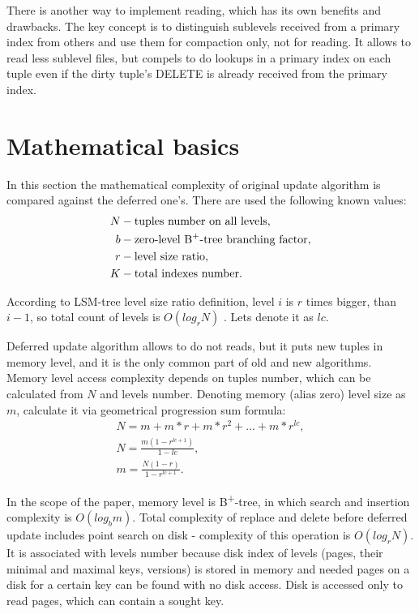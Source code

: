 \documentclass{vldb}
\begin{document}
There is another way to implement reading, which has its own benefits and
drawbacks. The key concept is to distinguish sublevels received from a primary
index from others and use them for compaction only, not for reading. It allows
to read less sublevel files, but compels to do lookups in a primary index on
each tuple even if the dirty tuple's DELETE is already received from the primary
index.

\section{Mathematical basics}

In this section the mathematical complexity of original update algorithm is
compared against the deferred one's. There are used the following known values:
\begin{align*}
N &- \text{tuples number on all levels}, \\
b &- \text{zero-level B\textsuperscript{+}-tree branching factor}, \\
r &- \text{level size ratio}, \\
K &- \text{total indexes number}.
\end{align*}

According to LSM-tree level size ratio definition, level $i$ is $r$ times
bigger, than $i - 1$, so total count of levels is $O(log_rN)$
\cite{kai:slimdb}. Lets denote it as $lc$.

Deferred update algorithm allows to do not reads, but it puts new tuples in
memory level, and it is the only common part of old and new algorithms. Memory
level access complexity depends on tuples number, which can be calculated from
$N$ and levels number. Denoting memory (alias zero) level size as $m$, calculate
it via geometrical progression sum formula:
\begin{gather*}
N = m + m*r + m*r^2 + ... + m*r^{lc}, \\
N = \frac{m(1 - r^{lc+1})}{1 - lc}, \\
m = \frac{N(1 - r)}{1 - r^{lc + 1}}.
\end{gather*}

In the scope of the paper, memory level is B\textsuperscript{+}-tree, in which
search and insertion complexity is $O(log_bm)$.
Total complexity of replace and delete before deferred update includes point
search on disk - complexity of this operation is $O(log_rN)$. It is associated
with levels number because disk index of levels (pages, their minimal and
maximal keys, versions) is stored in memory and needed pages on a disk for a
certain key can be found with no disk access. Disk is accessed only to read
pages, which can contain a sought key.
\end{document}
